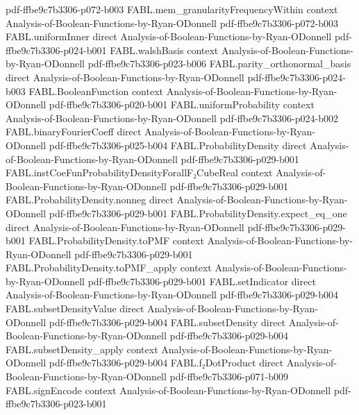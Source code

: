 \begin{theorem}
  {pdf-ffbe9c7b3306-p072-b003}
\proofstep
  {FABL.mem_granularityFrequencyWithin}
  {context}
  {Analysis-of-Boolean-Functions-by-Ryan-ODonnell}
  {pdf-ffbe9c7b3306-p072-b003}
\proofstep
  {FABL.uniformInner}
  {direct}
  {Analysis-of-Boolean-Functions-by-Ryan-ODonnell}
  {pdf-ffbe9c7b3306-p024-b001}
\proofstep
  {FABL.walshBasis}
  {context}
  {Analysis-of-Boolean-Functions-by-Ryan-ODonnell}
  {pdf-ffbe9c7b3306-p023-b006}
\proofstep
  {FABL.parity_orthonormal_basis}
  {direct}
  {Analysis-of-Boolean-Functions-by-Ryan-ODonnell}
  {pdf-ffbe9c7b3306-p024-b003}
\proofstep
  {FABL.BooleanFunction}
  {context}
  {Analysis-of-Boolean-Functions-by-Ryan-ODonnell}
  {pdf-ffbe9c7b3306-p020-b001}
\proofstep
  {FABL.uniformProbability}
  {context}
  {Analysis-of-Boolean-Functions-by-Ryan-ODonnell}
  {pdf-ffbe9c7b3306-p024-b002}
\proofstep
  {FABL.binaryFourierCoeff}
  {direct}
  {Analysis-of-Boolean-Functions-by-Ryan-ODonnell}
  {pdf-ffbe9c7b3306-p025-b004}
\proofstep
  {FABL.ProbabilityDensity}
  {direct}
  {Analysis-of-Boolean-Functions-by-Ryan-ODonnell}
  {pdf-ffbe9c7b3306-p029-b001}
\proofstep
  {FABL.instCoeFunProbabilityDensityForallF₂CubeReal}
  {context}
  {Analysis-of-Boolean-Functions-by-Ryan-ODonnell}
  {pdf-ffbe9c7b3306-p029-b001}
\proofstep
  {FABL.ProbabilityDensity.nonneg}
  {direct}
  {Analysis-of-Boolean-Functions-by-Ryan-ODonnell}
  {pdf-ffbe9c7b3306-p029-b001}
\proofstep
  {FABL.ProbabilityDensity.expect_eq_one}
  {direct}
  {Analysis-of-Boolean-Functions-by-Ryan-ODonnell}
  {pdf-ffbe9c7b3306-p029-b001}
\proofstep
  {FABL.ProbabilityDensity.toPMF}
  {context}
  {Analysis-of-Boolean-Functions-by-Ryan-ODonnell}
  {pdf-ffbe9c7b3306-p029-b001}
\proofstep
  {FABL.ProbabilityDensity.toPMF_apply}
  {context}
  {Analysis-of-Boolean-Functions-by-Ryan-ODonnell}
  {pdf-ffbe9c7b3306-p029-b001}
\proofstep
  {FABL.setIndicator}
  {direct}
  {Analysis-of-Boolean-Functions-by-Ryan-ODonnell}
  {pdf-ffbe9c7b3306-p029-b004}
\proofstep
  {FABL.subsetDensityValue}
  {direct}
  {Analysis-of-Boolean-Functions-by-Ryan-ODonnell}
  {pdf-ffbe9c7b3306-p029-b004}
\proofstep
  {FABL.subsetDensity}
  {direct}
  {Analysis-of-Boolean-Functions-by-Ryan-ODonnell}
  {pdf-ffbe9c7b3306-p029-b004}
\proofstep
  {FABL.subsetDensity_apply}
  {context}
  {Analysis-of-Boolean-Functions-by-Ryan-ODonnell}
  {pdf-ffbe9c7b3306-p029-b004}
\proofstep
  {FABL.f₂DotProduct}
  {direct}
  {Analysis-of-Boolean-Functions-by-Ryan-ODonnell}
  {pdf-ffbe9c7b3306-p071-b009}
\proofstep
  {FABL.signEncode}
  {context}
  {Analysis-of-Boolean-Functions-by-Ryan-ODonnell}
  {pdf-ffbe9c7b3306-p023-b001}
\proofstep

\end{theorem}

